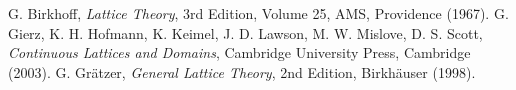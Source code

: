 \documentclass[12pt]{article}
\begin{document}
\begin{thebibliography}{8}
 G. Birkhoff, {\em Lattice Theory}, 3rd Edition, Volume 25, AMS, Providence (1967).
 G. Gierz, K. H. Hofmann, K. Keimel, J. D. Lawson, M. W. Mislove, D. S. Scott, {\em Continuous Lattices and Domains}, Cambridge University Press, Cambridge (2003).
 G. Gr\"{a}tzer, {\em General Lattice Theory}, 2nd Edition, Birkh\"{a}user (1998).
\end{thebibliography}
\end{document}
